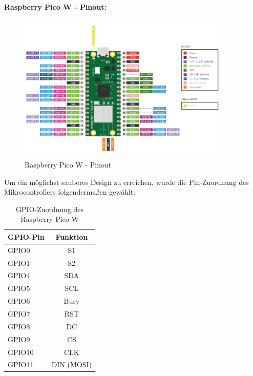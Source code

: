 \begin{inhalt}
\textbf{Raspberry Pico W - Pinout:}

\begin{figure}[!htb]
\centering
\includegraphics[width=0.90\textwidth]{files/Tobias/pics/Pinout/pico2w-pinout.pdf}
\caption[Raspberry Pico W - Pinout]{Raspberry Pico W - Pinout}
\label{fig:PicoW_Pinout}
\end{figure}




Um ein möglichst sauberes Design zu erreichen, wurde die Pin-Zuordnung des Mikrocontrollers folgendermaßen gewählt:

\renewcommand{\arraystretch}{1}

\begin{table}[H]
\centering
{}
\begin{tabular}{|l|c|}
\hline
\rowcolor{cyan!20}
\textbf{GPIO-Pin} & \textbf{Funktion} \\
\hline
GPIO0 & S1 \\
\hline
GPIO1 & S2 \\
\hline
GPIO4 & SDA \\
\hline
GPIO5 & SCL \\
\hline
GPIO6 & Busy \\
\hline
GPIO7 & RST \\
\hline
GPIO8 & DC \\
\hline
GPIO9 & CS \\
\hline
GPIO10 & CLK \\
\hline
GPIO11 & DIN (MOSI) \\
\hline
\end{tabular}
\caption{GPIO-Zuordnung des Raspberry Pico W}
\label{tab:GPIO_Zuordnung}
\end{table}



\end{inhalt}
